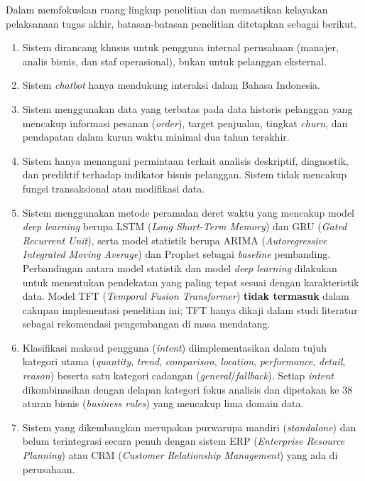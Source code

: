 Dalam memfokuskan ruang lingkup penelitian dan memastikan kelayakan pelaksanaan tugas akhir, batasan-batasan penelitian ditetapkan sebagai berikut.
\begin{enumerate}
  \item Sistem dirancang khusus untuk pengguna internal perusahaan (manajer, analis bisnis, dan staf operasional), bukan untuk pelanggan eksternal.

  \item Sistem \textit{chatbot} hanya mendukung interaksi dalam Bahasa Indonesia.

  \item Sistem menggunakan data yang  terbatas pada data historis pelanggan yang mencakup informasi pesanan (\textit{order}), target penjualan, tingkat \textit{churn}, dan pendapatan dalam kurun waktu minimal dua tahun terakhir.

  \item Sistem hanya menangani permintaan terkait analisis deskriptif, diagnostik, dan prediktif terhadap indikator bisnis pelanggan. Sistem tidak mencakup fungsi transaksional atau modifikasi data.

  \item Sistem menggunakan metode peramalan deret waktu yang mencakup model \textit{deep learning} berupa LSTM\label{abbr:LSTM} (\textit{Long Short-Term Memory}) dan GRU\label{abbr:GRU} (\textit{Gated Recurrent Unit}), serta model statistik berupa ARIMA\label{abbr:ARIMA} (\textit{Autoregressive Integrated Moving Average}) dan Prophet sebagai \textit{baseline} pembanding. Perbandingan antara model statistik dan model \textit{deep learning} dilakukan untuk menentukan pendekatan yang paling tepat sesuai dengan karakteristik data. Model TFT\label{abbr:TFT} (\textit{Temporal Fusion Transformer}) \textbf{tidak termasuk} dalam cakupan implementasi penelitian ini; TFT hanya dikaji dalam studi literatur sebagai rekomendasi pengembangan di masa mendatang.

  \item Klasifikasi maksud pengguna (\textit{intent}) diimplementasikan dalam tujuh kategori utama (\textit{quantity}, \textit{trend}, \textit{comparison}, \textit{location}, \textit{performance}, \textit{detail}, \textit{reason}) beserta satu kategori cadangan (\textit{general}/\textit{fallback}). Setiap \textit{intent} dikombinasikan dengan delapan kategori fokus analisis dan dipetakan ke 38 aturan bisnis (\textit{business rules}) yang mencakup lima domain data.

  \item Sistem yang dikembangkan merupakan purwarupa mandiri (\textit{standalone}) dan belum terintegrasi secara penuh dengan sistem ERP\label{abbr:ERP} (\textit{Enterprise Resource Planning}) atau CRM (\textit{Customer Relationship Management}) yang ada di perusahaan.


\end{enumerate}
